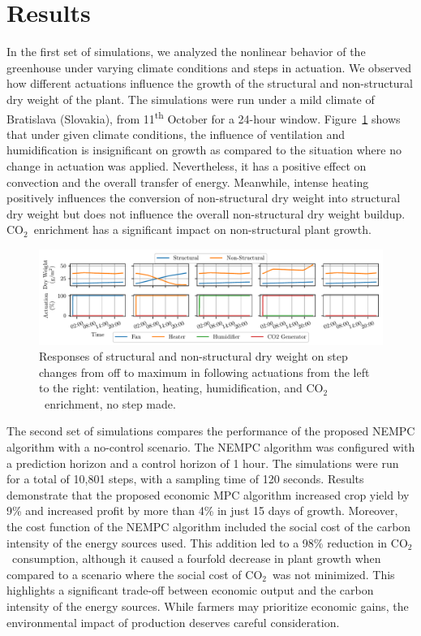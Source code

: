 \documentclass[conference]{IEEEtran}
\newcommand{\coo}{\ensuremath{\mathrm{CO_2}}}
\begin{document}
\section{Results}
In the first set of simulations, we analyzed the nonlinear behavior of the greenhouse under varying climate conditions and steps in actuation. We observed how different actuations influence the growth of the structural and non-structural dry weight of the plant. The simulations were run under a mild climate of Bratislava (Slovakia), from 11\textsuperscript{th} October for a 24-hour window. Figure~\ref{fig:steps} shows that under given climate conditions,
the influence of ventilation and humidification is insignificant on growth as compared to the situation where no change in actuation was applied.
Nevertheless, it has a positive effect on convection and the overall transfer of energy. Meanwhile, intense heating positively influences the conversion of non-structural dry weight into structural dry weight but does not influence the overall non-structural dry weight buildup.~\coo\ enrichment has a significant impact on non-structural plant growth.

\begin{figure}
    \centering
    \includegraphics[width=\textwidth]{figures/step_response-outputs-2024-10-11_2024-10-26-120s.pdf}
    \caption{Responses of structural and non-structural dry weight on step changes from off to maximum in following actuations from the left to the right: ventilation, heating, humidification, and \coo\ enrichment, no step made.}\label{fig:steps}
\end{figure}


The second set of simulations compares the performance of the proposed NEMPC algorithm with a no-control scenario. The NEMPC algorithm was configured with a prediction horizon and a control horizon of 1 hour. The simulations were run for a total of 10,801 steps, with a sampling time of 120 seconds. Results demonstrate that the proposed economic MPC algorithm increased crop yield by 9\% and increased profit by more than 4\% in just 15 days of growth.
Moreover, the cost function of the NEMPC algorithm included the social cost of the carbon intensity of the energy sources used. This addition led to a 98\% reduction in \coo\ consumption, although it caused a fourfold decrease in plant growth when compared to a scenario where the social cost of \coo\ was not minimized. This highlights a significant trade-off between economic output and the carbon intensity of the energy sources. While farmers may prioritize economic gains, the environmental impact of production deserves careful consideration.
\end{document}
